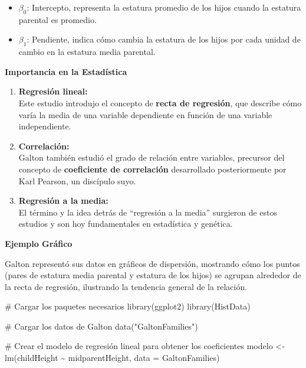 \documentclass[
  letterpaper,
  DIV=11,
  numbers=noendperiod]{scrreprt}
\newenvironment{Shaded}{\begin{snugshade}}{\end{snugshade}}
\newcommand{\AttributeTok}[1]{\textcolor[rgb]{0.40,0.45,0.13}{#1}}
\newcommand{\CommentTok}[1]{\textcolor[rgb]{0.37,0.37,0.37}{#1}}
\newcommand{\FunctionTok}[1]{\textcolor[rgb]{0.28,0.35,0.67}{#1}}
\newcommand{\NormalTok}[1]{\textcolor[rgb]{0.00,0.23,0.31}{#1}}
\newcommand{\OtherTok}[1]{\textcolor[rgb]{0.00,0.23,0.31}{#1}}
\newcommand{\SpecialCharTok}[1]{\textcolor[rgb]{0.37,0.37,0.37}{#1}}
\newcommand{\StringTok}[1]{\textcolor[rgb]{0.13,0.47,0.30}{#1}}
\providecommand{\tightlist}{%
  \setlength{\itemsep}{0pt}\setlength{\parskip}{0pt}}
\begin{document}
\begin{tcolorbox}
\begin{enumerate}
  \begin{itemize}
  \tightlist
  \item
    \(\beta_0\): Intercepto, representa la estatura promedio de los
    hijos cuando la estatura parental es promedio.
  \item
    \(\beta_1\): Pendiente, indica cómo cambia la estatura de los hijos
    por cada unidad de cambio en la estatura media parental.
  \end{itemize}
\end{enumerate}

\textbf{Importancia en la Estadística}

\begin{enumerate}
\def\labelenumi{\arabic{enumi}.}
\item
  \textbf{Regresión lineal:}\\
  Este estudio introdujo el concepto de \textbf{recta de regresión}, que
  describe cómo varía la media de una variable dependiente en función de
  una variable independiente.
\item
  \textbf{Correlación:}\\
  Galton también estudió el grado de relación entre variables, precursor
  del concepto de \textbf{coeficiente de correlación} desarrollado
  posteriormente por Karl Pearson, un discípulo suyo.
\item
  \textbf{Regresión a la media:}\\
  El término y la idea detrás de ``regresión a la media'' surgieron de
  estos estudios y son hoy fundamentales en estadística y genética.
\end{enumerate}

\textbf{Ejemplo Gráfico}

Galton representó sus datos en gráficos de dispersión, mostrando cómo
los puntos (pares de estatura media parental y estatura de los hijos) se
agrupan alrededor de la recta de regresión, ilustrando la tendencia
general de la relación.

\begin{Shaded}
\begin{Highlighting}[]
\CommentTok{\# Cargar los paquetes necesarios}
\FunctionTok{library}\NormalTok{(ggplot2)}
\FunctionTok{library}\NormalTok{(HistData)}

\CommentTok{\# Cargar los datos de Galton}
\FunctionTok{data}\NormalTok{(}\StringTok{"GaltonFamilies"}\NormalTok{)}

\CommentTok{\# Crear el modelo de regresión lineal para obtener los coeficientes}
\NormalTok{modelo }\OtherTok{\textless{}{-}} \FunctionTok{lm}\NormalTok{(childHeight }\SpecialCharTok{\textasciitilde{}}\NormalTok{ midparentHeight, }\AttributeTok{data =}\NormalTok{ GaltonFamilies)}


\end{Highlighting}
\end{Shaded}
\end{tcolorbox}
\end{document}
